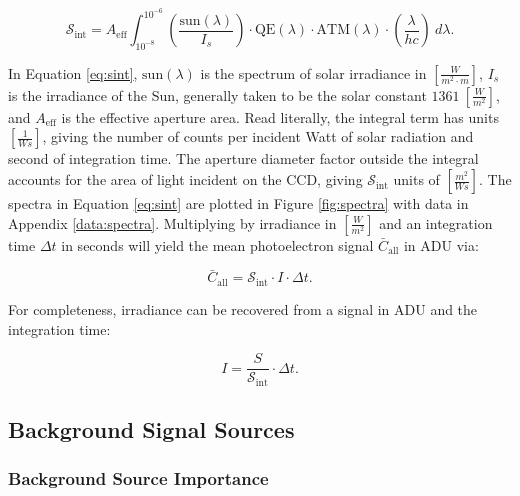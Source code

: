 \begin{equation} \label{eq:sint}
 \mathcal{S}_\mathrm{int} = A_\mathrm{eff}
	\int_{10^{-8}}^{10^{-6}}{ \left( \frac{\textrm{sun}(\lambda)}{I_s} \right) \cdot \textrm{QE}(\lambda) \cdot \textrm{ATM}(\lambda)
  \cdot \left( \frac{\lambda}{h c} \right) \: d\lambda}.
\end{equation}

In Equation \ref{eq:sint}, $\textrm{sun}(\lambda)$ is the spectrum of solar irradiance in 
$\left[\frac{W}{m^2\cdot m} \right]$, $I_s$ is the irradiance of the Sun, generally taken to be
the solar constant $1361 \: \left[ \frac{W}{m^2} \right]$, and $A_\mathrm{eff}$ is the effective aperture area. Read literally, the integral term has
units $\left[ \frac{1}{Ws} \right]$, giving the number of counts per incident Watt of solar
radiation and second of integration time. The aperture diameter factor outside the integral accounts
for the area of light incident on the CCD, giving $\mathcal{S}_\mathrm{int}$ units of $\left[ \frac{m^2}{Ws}
\right]$. The spectra in Equation \ref{eq:sint} are plotted in Figure \ref{fig:spectra} with data in Appendix \ref{data:spectra}. Multiplying by irradiance in $\left[ \frac{W}{m^2} \right]$ and an integration time $\Delta t$ 
in seconds will yield the mean photoelectron signal $\bar{C}_\mathrm{all}$ in ADU via:

\begin{equation} \label{eq:irrad_to_count}
  \bar{C}_\mathrm{all} = \mathcal{S}_\mathrm{int} \cdot I \cdot \Delta t.
\end{equation}

For completeness, irradiance can be recovered from a signal in ADU and the integration time:

\begin{equation} \label{eq:count_to_irrad}
  I = \frac{S}{\mathcal{S}_\mathrm{int}} \cdot \Delta t.
\end{equation}

\subsection{Background Signal Sources}

\subsubsection{Background Source Importance}


